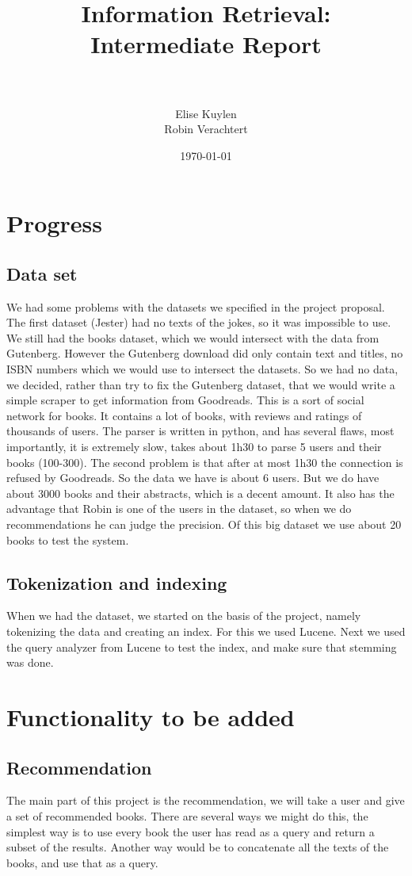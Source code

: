 \documentclass{scrartcl}
\title{
    \normalfont \huge
    {Information Retrieval: Intermediate Report} \\ %
    \horrule{2pt} \\[0.5cm] %
}
\author{Elise Kuylen\\ Robin Verachtert}
\date{\normalsize\today}
\begin{document}
\maketitle
\section{Progress}
\subsection{Data set}
We had some problems with the datasets we specified in the project proposal. The first dataset (Jester) had no texts of the jokes, so it was impossible to use.\\
We still had the books dataset, which we would intersect with the data from Gutenberg. However the Gutenberg download did only contain text and titles, no ISBN numbers which we would use to intersect the datasets. So we had no data, we decided, rather than try to fix the Gutenberg dataset, that we would write a simple scraper to get information from Goodreads. This is a sort of social network for books. It contains a lot of books, with reviews and ratings of thousands of users. The parser is written in python, and has several flaws, most importantly, it is extremely slow, takes about 1h30 to parse 5 users and their books (100-300). The second problem is that after at most 1h30 the connection is refused by Goodreads. So the data we have is about 6 users. But we do have about 3000 books and their abstracts, which is a decent amount. It also has the advantage that Robin is one of the users in the dataset, so when we do recommendations he can judge the precision. Of this big dataset we use about 20 books to test the system.

\subsection{Tokenization and indexing}
When we had the dataset, we started on the basis of the project, namely tokenizing the data and creating an index. For this we used Lucene. 
Next we used the query analyzer from Lucene to test the index, and make sure that stemming was done.

\section{Functionality to be added}
\subsection{Recommendation}
The main part of this project is the recommendation, we will take a user and give a set of recommended books. There are several ways we might do this, the simplest way is to use every book the user has read as a query and return a subset of the results. Another way would be to concatenate all the texts of the books, and use that as a query.
\end{document}
